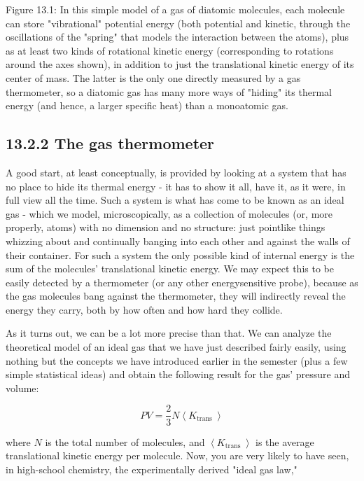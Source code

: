 \documentclass[10pt]{article}
\begin{document}
Figure 13.1: In this simple model of a gas of diatomic molecules, each molecule can store "vibrational" potential energy (both potential and kinetic, through the oscillations of the "spring" that models the interaction between the atoms), plus as at least two kinds of rotational kinetic energy (corresponding to rotations around the axes shown), in addition to just the translational kinetic energy of its center of mass. The latter is the only one directly measured by a gas thermometer, so a diatomic gas has many more ways of "hiding" its thermal energy (and hence, a larger specific heat) than a monoatomic gas.

\subsection*{13.2.2 The gas thermometer}
A good start, at least conceptually, is provided by looking at a system that has no place to hide its thermal energy - it has to show it all, have it, as it were, in full view all the time. Such a system is what has come to be known as an ideal gas - which we model, microscopically, as a collection of molecules (or, more properly, atoms) with no dimension and no structure: just pointlike things whizzing about and continually banging into each other and against the walls of their container. For such a system the only possible kind of internal energy is the sum of the molecules' translational kinetic energy. We may expect this to be easily detected by a thermometer (or any other energysensitive probe), because as the gas molecules bang against the thermometer, they will indirectly reveal the energy they carry, both by how often and how hard they collide.

As it turns out, we can be a lot more precise than that. We can analyze the theoretical model of an ideal gas that we have just described fairly easily, using nothing but the concepts we have introduced earlier in the semester (plus a few simple statistical ideas) and obtain the following result for the gas' pressure and volume:


\begin{equation*}
P V=\frac{2}{3} N\left\langle K_{\text {trans }}\right\rangle \tag{13.5}
\end{equation*}


where $N$ is the total number of molecules, and $\left\langle K_{\text {trans }}\right\rangle$ is the average translational kinetic energy per molecule. Now, you are very likely to have seen, in high-school chemistry, the experimentally derived "ideal gas law,"
\end{document}
